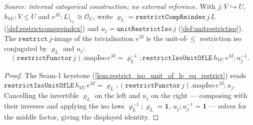 \begin{lemma}\leanok
  \label{lem:trivialisation_em_leg}
  \textit{Source: internal categorical construction; no external reference.}
  With \(j : V \hookrightarrow U\), \(h_{VU} : V \le U\) and \(e^M : L|_{\iota_U} \cong \mathcal O_U\),
  write \(\varrho_L = \mathtt{restrictCompReindex}\,j\,L\) (\cref{def:restrictcompreindex}) and
  \(u_j = \mathtt{unitRestrictIso}\,j\) (\cref{def:unitrestrictiso}). The \(\mathtt{restrict}\,j\)-image of
  the trivialisation \(e^M\) is the unit-of-\(\le\) restriction iso conjugated by \(\varrho_L\) and
  \(u_j\):
  \[
    (\mathtt{restrictFunctor}\,j).\mathrm{mapIso}\,e^M
      = \varrho_L^{-1} \mathbin{;} \mathtt{restrictIsoUnitOfLE}\,h_{VU}\,e^M \mathbin{;} u_j^{-1}.
  \]
\end{lemma}
\begin{proof}
  \leanok
  The Seam-1 keystone (\cref{lem:restrict_iso_unit_of_le_eq_restrict}) reads
  \(\mathtt{restrictIsoUnitOfLE}\,h_{VU}\,e^M
    = \varrho_L \mathbin{;} (\mathtt{restrictFunctor}\,j).\mathrm{mapIso}\,e^M \mathbin{;} u_j\).
  Cancelling the invertible \(\varrho_L\) on the left and \(u_j\) on the right --- composing with their
  inverses and applying the iso laws \(\varrho_L^{-1} \mathbin{;} \varrho_L = \mathbf 1\),
  \(u_j \mathbin{;} u_j^{-1} = \mathbf 1\) --- solves for the middle factor, giving the displayed identity.
\end{proof}

